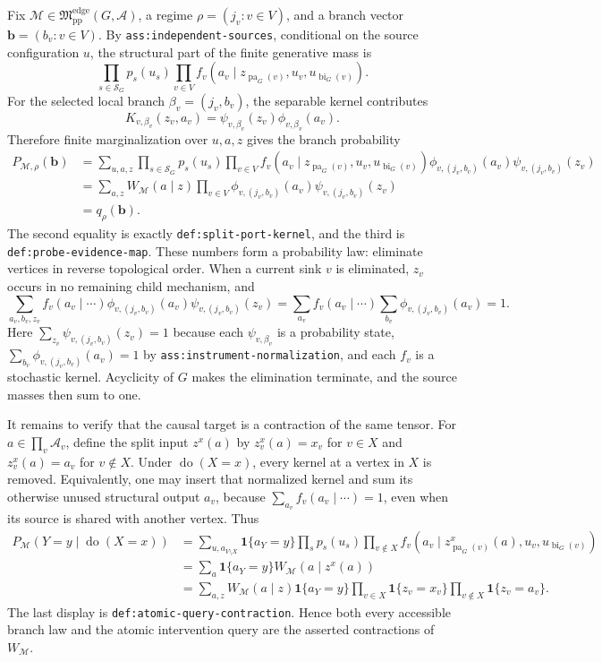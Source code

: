 Fix \(\mathcal M\in\mathfrak M_{\mathrm{pp}}^{\mathrm{edge}}(G,\mathcal A)\), a regime \(\rho=(j_v:v\in V)\), and a branch vector \(\boldsymbol b=(b_v:v\in V)\).  By \texttt{ass:independent-sources}, conditional on the source configuration \(u\), the structural part of the finite generative mass is
\[
 \prod_{s\in\mathcal S_G}p_s(u_s)
 \prod_{v\in V}f_v\!\left(a_v\mid
 z_{\operatorname{pa}_G(v)},u_v,u_{\operatorname{bi}_G(v)}\right).
\]
For the selected local branch \(\beta_v=(j_v,b_v)\), the separable kernel contributes
\[
 K_{v,\beta_v}(z_v,a_v)
 =\psi_{v,\beta_v}(z_v)\phi_{v,\beta_v}(a_v).
\]
Therefore finite marginalization over \(u,a,z\) gives the branch probability
\[
\begin{aligned}
 P_{\mathcal M,\rho}(\boldsymbol b)
 &=\sum_{u,a,z}
 \prod_{s\in\mathcal S_G}p_s(u_s)
 \prod_{v\in V}
 f_v\!\left(a_v\mid z_{\operatorname{pa}_G(v)},u_v,
 u_{\operatorname{bi}_G(v)}\right)
 \phi_{v,(j_v,b_v)}(a_v)\psi_{v,(j_v,b_v)}(z_v)\\
 &=\sum_{a,z}W_{\mathcal M}(a\mid z)
 \prod_{v\in V}\phi_{v,(j_v,b_v)}(a_v)
 \psi_{v,(j_v,b_v)}(z_v)\\
 &=q_\rho(\boldsymbol b).
\end{aligned}
\]
The second equality is exactly \texttt{def:split-port-kernel}, and the third is \texttt{def:probe-evidence-map}.  These numbers form a probability law: eliminate vertices in reverse topological order.  When a current sink \(v\) is eliminated, \(z_v\) occurs in no remaining child mechanism, and
\[
 \sum_{a_v,b_v,z_v}f_v(a_v\mid\cdots)
 \phi_{v,(j_v,b_v)}(a_v)\psi_{v,(j_v,b_v)}(z_v)
 =\sum_{a_v}f_v(a_v\mid\cdots)
 \sum_{b_v}\phi_{v,(j_v,b_v)}(a_v)=1.
\]
Here \(\sum_{z_v}\psi_{v,(j_v,b_v)}(z_v)=1\) because each \(\psi_{v,\beta_v}\) is a probability state, \(\sum_{b_v}\phi_{v,(j_v,b_v)}(a_v)=1\) by \texttt{ass:instrument-normalization}, and each \(f_v\) is a stochastic kernel.  Acyclicity of \(G\) makes the elimination terminate, and the source masses then sum to one.

It remains to verify that the causal target is a contraction of the same tensor.  For \(a\in\prod_v\mathcal A_v\), define the split input \(z^{x}(a)\) by \(z^{x}_v(a)=x_v\) for \(v\in X\) and \(z^{x}_v(a)=a_v\) for \(v\notin X\).  Under \(\operatorname{do}(X=x)\), every kernel at a vertex in \(X\) is removed.  Equivalently, one may insert that normalized kernel and sum its otherwise unused structural output \(a_v\), because \(\sum_{a_v}f_v(a_v\mid\cdots)=1\), even when its source is shared with another vertex.  Thus
\[
\begin{aligned}
 P_{\mathcal M}(Y=y\mid\operatorname{do}(X=x))
 &=\sum_{u,a_{V\setminus X}}\mathbf 1\{a_Y=y\}
 \prod_s p_s(u_s)\prod_{v\notin X}
 f_v\!\left(a_v\mid z^x_{\operatorname{pa}_G(v)}(a),
 u_v,u_{\operatorname{bi}_G(v)}\right)\\
 &=\sum_a\mathbf 1\{a_Y=y\}
 W_{\mathcal M}\!\left(a\mid z^x(a)\right)\\
 &=\sum_{a,z}W_{\mathcal M}(a\mid z)\mathbf 1\{a_Y=y\}
 \prod_{v\in X}\mathbf 1\{z_v=x_v\}
 \prod_{v\notin X}\mathbf 1\{z_v=a_v\}.
\end{aligned}
\]
The last display is \texttt{def:atomic-query-contraction}.  Hence both every accessible branch law and the atomic intervention query are the asserted contractions of \(W_{\mathcal M}\).